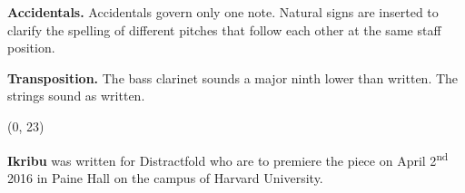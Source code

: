 \documentclass[10pt]{article}
\begin{document}
\begin{textblock}{23}
\textbf{Accidentals.} Accidentals govern only one note. Natural signs are
inserted to clarify the spelling of different pitches that follow each other at
the same staff position.

\textbf{Transposition.} The bass clarinet sounds a major ninth lower than
written. The strings sound as written.

\end{textblock}

\begin{textblock}{23}(0, 23)

\textbf{Ikribu} was written for Distractfold who are to premiere the piece on
April 2\textsuperscript{nd} 2016 in Paine Hall on the campus of Harvard
University.

\end{textblock}
\end{document}
